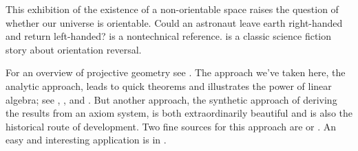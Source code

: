 This exhibition of the existence of a 
non-orientable space raises the question of whether our universe
is orientable.
Could 
an astronaut leave earth right-handed and return left-handed?
\cite{Gardner} is a nontechnical reference.
\cite{Clarke} is a classic science fiction story about 
orientation reversal.

For an overview of projective geometry see \cite{CourantRobbins}. 
The approach we've taken here, the analytic approach,
leads to quick theorems and %
illustrates 
the power of linear algebra; see \cite{Hanes}, \cite{Ryan}, and
\cite{Eggar}.
But another approach, the 
synthetic approach of deriving the results
from an axiom system, is both extraordinarily
beautiful and is also the historical route of development.
Two fine sources for this approach are \cite{Coxeter} or \cite{Seidenberg}.
An easy and interesting application is in \cite{Davies}.

